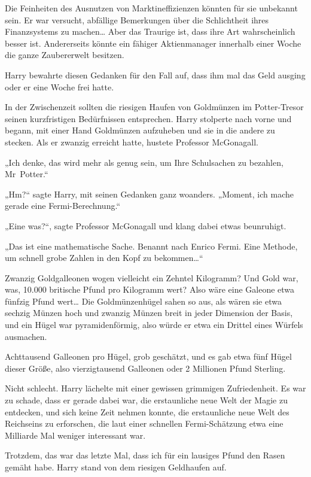 {Die Feinheiten des Ausnutzen von Marktineffizienzen könnten für sie unbekannt sein. Er war versucht, abfällige Bemerkungen über die Schlichtheit ihres Finanzsystems zu machen… Aber das Traurige ist, dass ihre Art wahrscheinlich besser ist. Andererseits könnte ein fähiger Aktienmanager innerhalb einer Woche die ganze Zaubererwelt besitzen.

Harry bewahrte diesen Gedanken für den Fall auf, dass ihm mal das Geld ausging oder er eine Woche frei hatte.

In der Zwischenzeit sollten die riesigen Haufen von Goldmünzen im Potter-Tresor seinen kurzfristigen Bedürfnissen entsprechen. Harry stolperte nach vorne und begann, mit einer Hand Goldmünzen aufzuheben und sie in die andere zu stecken. Als er zwanzig erreicht hatte, hustete Professor McGonagall.

„Ich denke, das wird mehr als genug sein, um Ihre Schulsachen zu bezahlen, Mr~Potter.“

„Hm?“ sagte Harry, mit seinen Gedanken ganz woanders. „Moment, ich mache gerade eine Fermi-Berechnung.“

„Eine was?“, sagte Professor McGonagall und klang dabei etwas beunruhigt.

„Das ist eine mathematische Sache. Benannt nach Enrico Fermi. Eine Methode, um schnell grobe Zahlen in den Kopf zu bekommen…“

Zwanzig Goldgalleonen wogen vielleicht ein Zehntel Kilogramm? Und Gold war, was, 10.000 britische Pfund pro Kilogramm wert? Also wäre eine Galeone etwa fünfzig Pfund wert… Die Goldmünzenhügel sahen so aus, als wären sie etwa sechzig Münzen hoch und zwanzig Münzen breit in jeder Dimension der Basis, und ein Hügel war pyramidenförmig, also würde er etwa ein Drittel eines Würfels ausmachen.

Achttausend Galleonen pro Hügel, grob geschätzt, und es gab etwa fünf Hügel dieser Größe, also vierzigtausend Galleonen oder 2 Millionen Pfund Sterling.

Nicht schlecht. Harry lächelte mit einer gewissen grimmigen Zufriedenheit. Es war zu schade, dass er gerade dabei war, die erstaunliche neue Welt der Magie zu entdecken, und sich keine Zeit nehmen konnte, die erstaunliche neue Welt des Reichseins zu erforschen, die laut einer schnellen Fermi-Schätzung etwa eine Milliarde Mal weniger interessant war.

Trotzdem, das war das letzte Mal, dass ich für ein lausiges Pfund den Rasen gemäht habe. Harry stand von dem riesigen Geldhaufen auf.

}
